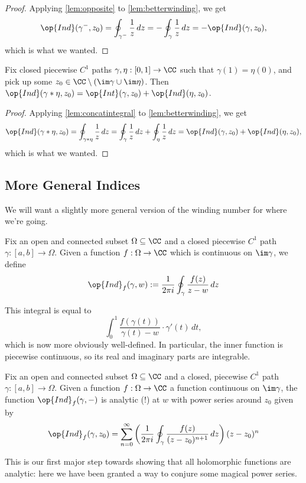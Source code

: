 \begin{proof}
	Applying \autoref{lem:opposite} to \autoref{lem:betterwinding}, we get
	\[\op{Ind}(\gamma^-,z_0)=\oint_{\gamma^-}\frac1z\,dz=-\oint_\gamma\frac1z\,dz=-\op{Ind}(\gamma,z_0),\]
	which is what we wanted.
\end{proof}
\begin{corollary}
	Fix closed piecewise $C^1$ paths $\gamma,\eta:[0,1]\to\CC$ such that $\gamma(1)=\eta(0)$, and pick up some $z_0\in\CC\setminus(\im\gamma\cup\im\eta)$. Then $\op{Ind}(\gamma*\eta,z_0)=\op{Int}(\gamma,z_0)+\op{Ind}(\eta,z_0)$.
\end{corollary}
\begin{proof}
	Applying \autoref{lem:concatintegral} to \autoref{lem:betterwinding}, we get
	\[\op{Ind}(\gamma*\eta,z_0)=\oint_{\gamma*\eta}\frac1z\,dz=\oint_\gamma\frac1z\,dz+\oint_\eta\frac1z\,dz=\op{Ind}(\gamma,z_0)+\op{Ind}(\eta,z_0),\]
	which is what we wanted.
\end{proof}

\subsection{More General Indices}
We will want a slightly more general version of the winding number for where we're going.
\begin{definition}[Index]
	Fix an open and connected subset $\Omega\subseteq\CC$ and a closed piecewise $C^1$ path $\gamma:[a,b]\to\Omega$. Given a function $f:\Omega\to\CC$ which is continuous on $\im\gamma$, we define
	\[\op{Ind}_f(\gamma,w):=\frac1{2\pi i}\oint_\gamma\frac{f(z)}{z-w}\,dz\]
\end{definition}
\begin{remark}
	This integral is equal to
	\[\int_0^1\frac{f(\gamma(t))}{\gamma(t)-w}\cdot\gamma'(t)\,dt,\]
	which is now more obviously well-defined. In particular, the inner function is piecewise continuous, so its real and imaginary parts are integrable.
\end{remark}
\begin{proposition} \label{prop:indexanalytic}
	Fix an open and connected subset $\Omega\subseteq\CC$ and a closed, piecewise $C^1$ path $\gamma:[a,b]\to\Omega$. Given a function $f:\Omega\to\CC$ a function continuous on $\im\gamma$, the function $\op{Ind}_f(\gamma,-)$ is analytic (!) at $w$ with power series around $z_0$ given by
	\[\op{Ind}_f(\gamma,z_0)=\sum_{n=0}^\infty\left(\frac1{2\pi i}\oint_\gamma\frac{f(z)}{(z-z_0)^{n+1}}\,dz\right)(z-z_0)^n\]
\end{proposition}
This is our first major step towards showing that all holomorphic functions are analytic: here we have been granted a way to conjure some magical power series.

